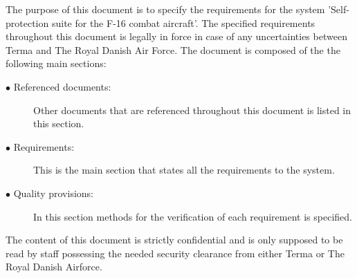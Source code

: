 The purpose of this document is to specify the requirements for the system 'Self-protection suite for the F-16 combat aircraft'. The specified requirements throughout this document is legally in force in case of any uncertainties between Terma and The Royal Danish Air Force.
The document is composed of the the following main sections:


    \begin{description}
    \item[$\bullet$ Referenced documents:] Other documents that are referenced throughout this document is listed in this section.
    \item[$\bullet$ Requirements:] This is the main section that states all the requirements to the system.
    \item[$\bullet$ Quality provisions:] In this section methods for the verification of each requirement is specified.
 
    \end{description}

The content of this document is strictly confidential and is only supposed to be read by staff possessing the needed security clearance from either Terma or The Royal Danish Airforce. 